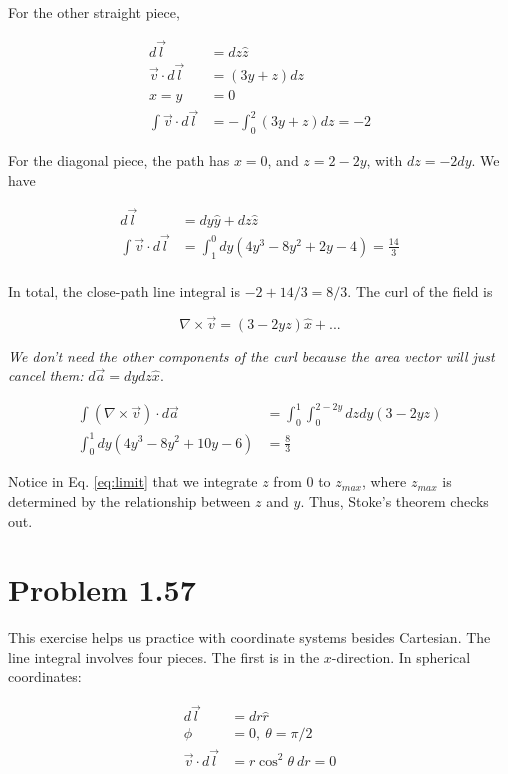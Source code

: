 \documentclass[10pt]{article}
\begin{document}
For the other straight piece,

\begin{align}
d\vec{l} &= dz \hat{z} \\
\vec{v} \cdot d\vec{l} &= (3y + z) dz \\
x = y &= 0 \\
\int \vec{v} \cdot d\vec{l} &= -\int_0^{2} (3y+z) dz = -2
\end{align}

For the diagonal piece, the path has $x = 0$, and $z = 2 - 2y$, with $dz = - 2 dy$.  We have

\begin{align}
d\vec{l} &= dy \hat{y} + dz \hat{z} \\
\int \vec{v} \cdot d\vec{l} &= \int_{1}^{0} dy \left( 4 y^3 - 8y^2 +2 y - 4\right) = \frac{14}{3} \\
\end{align}

In total, the close-path line integral is $\boxed{-2 + 14/3 = 8/3}$.  The curl of the field is

\begin{equation}
\nabla \times \vec{v} = (3 - 2 y z)\hat{x} + ...
\end{equation}

\textit{We don't need the other components of the curl because the area vector will just cancel them:} $d\vec{a} = dy dz \hat{x}$.

\begin{align}
\int (\nabla \times \vec{v}) \cdot d\vec{a} &= \int_{0}^{1} \int_{0}^{2 - 2y} dz dy (3 - 2 y z) \label{eq:limit} \\
\int_{0}^{1} dy \left( 4y^3 - 8y^2 + 10y -6 \right) &= \frac{8}{3}
\end{align}

Notice in Eq. \ref{eq:limit} that we integrate $z$ from $0$ to $z_{max}$, where $z_{max}$ is determined by the relationship between $z$ and $y$.  Thus, Stoke's theorem checks out.

\section{Problem 1.57}

This exercise helps us practice with coordinate systems besides Cartesian.  The line integral involves four pieces.  The first is in the $x$-direction.  In spherical coordinates:

\begin{align}
d\vec{l} &= dr \hat{r} \\
\phi &= 0, ~ \theta = \pi/2 \\
\vec{v} \cdot d\vec{l} &= r \cos^2\theta ~ dr = 0
\end{align}
\end{document}
